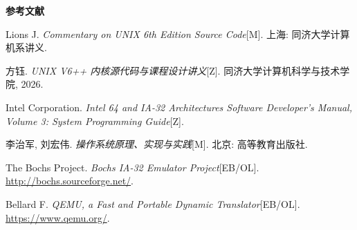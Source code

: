 \clearpage
{}
{}
\begin{center}
{\huge\bfseries 参考文献}\par
\end{center}
\vspace{1.2em}

\begin{enumerate}[label={[\arabic*]},leftmargin=2.6em,itemsep=4pt]

  \item Lions J. \emph{Commentary on UNIX 6th Edition Source Code}[M].
        上海: 同济大学计算机系讲义.

  \item 方钰. \emph{UNIX V6++ 内核源代码与课程设计讲义}[Z].
        同济大学计算机科学与技术学院, 2026.

  \item Intel Corporation. \emph{Intel 64 and IA-32 Architectures Software
        Developer's Manual, Volume 3: System Programming Guide}[Z].

  \item 李治军, 刘宏伟. \emph{操作系统原理、实现与实践}[M].
        北京: 高等教育出版社.

  \item The Bochs Project. \emph{Bochs IA-32 Emulator Project}[EB/OL].
        \url{http://bochs.sourceforge.net/}.

  \item Bellard F. \emph{QEMU, a Fast and Portable Dynamic Translator}[EB/OL].
        \url{https://www.qemu.org/}.

\end{enumerate}
